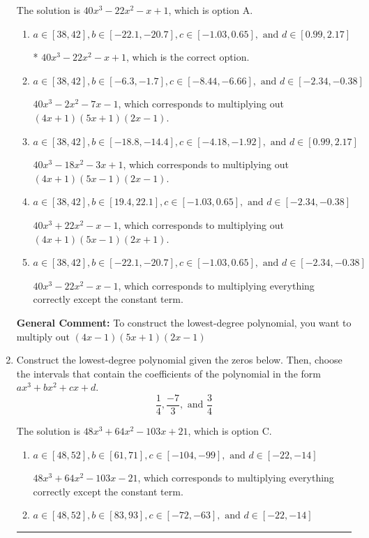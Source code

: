 \documentclass{extbook}[14pt]
\newcommand{\litem}[1]{\item #1

\rule{\textwidth}{0.4pt}}
\begin{document}
\begin{enumerate}
{The solution is \( 40x^{3} -22 x^{2} -x + 1 \), which is option A.\begin{enumerate}[label=\Alph*.]
\item \( a \in [38, 42], b \in [-22.1, -20.7], c \in [-1.03, 0.65], \text{ and } d \in [0.99, 2.17] \)

* $40x^{3} -22 x^{2} -x + 1$, which is the correct option.
\item \( a \in [38, 42], b \in [-6.3, -1.7], c \in [-8.44, -6.66], \text{ and } d \in [-2.34, -0.38] \)

$40x^{3} -2 x^{2} -7 x -1$, which corresponds to multiplying out $(4x + 1)(5x + 1)(2x -1)$.
\item \( a \in [38, 42], b \in [-18.8, -14.4], c \in [-4.18, -1.92], \text{ and } d \in [0.99, 2.17] \)

$40x^{3} -18 x^{2} -3 x + 1$, which corresponds to multiplying out $(4x + 1)(5x -1)(2x -1)$.
\item \( a \in [38, 42], b \in [19.4, 22.1], c \in [-1.03, 0.65], \text{ and } d \in [-2.34, -0.38] \)

$40x^{3} +22 x^{2} -x -1$, which corresponds to multiplying out $(4x + 1)(5x -1)(2x + 1)$.
\item \( a \in [38, 42], b \in [-22.1, -20.7], c \in [-1.03, 0.65], \text{ and } d \in [-2.34, -0.38] \)

$40x^{3} -22 x^{2} -x -1$, which corresponds to multiplying everything correctly except the constant term.
\end{enumerate}

\textbf{General Comment:} To construct the lowest-degree polynomial, you want to multiply out $(4x -1)(5x + 1)(2x -1)$
}
\litem{
Construct the lowest-degree polynomial given the zeros below. Then, choose the intervals that contain the coefficients of the polynomial in the form $ax^3+bx^2+cx+d$.
\[ \frac{1}{4}, \frac{-7}{3}, \text{ and } \frac{3}{4} \]

The solution is \( 48x^{3} +64 x^{2} -103 x + 21 \), which is option C.\begin{enumerate}[label=\Alph*.]
\item \( a \in [48, 52], b \in [61, 71], c \in [-104, -99], \text{ and } d \in [-22, -14] \)

$48x^{3} +64 x^{2} -103 x -21$, which corresponds to multiplying everything correctly except the constant term.
\item \( a \in [48, 52], b \in [83, 93], c \in [-72, -63], \text{ and } d \in [-22, -14] \)


\end{enumerate}}
\end{enumerate}
\end{document}
